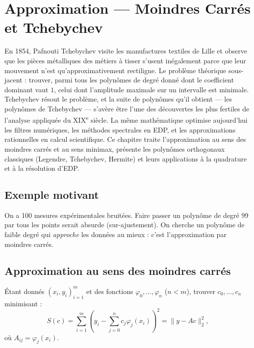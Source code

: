 \chapter{Approximation --- Moindres Carr\'es et Tchebychev}
\label{ch:approximation}

En 1854, Pafnouti Tchebychev visite les manufactures textiles de Lille et observe que les pièces métalliques des métiers à tisser s'usent inégalement parce que leur mouvement n'est qu'approximativement rectiligne. Le problème théorique sous-jacent : trouver, parmi tous les polynômes de degré donné dont le coefficient dominant vaut $1$, celui dont l'amplitude maximale sur un intervalle est minimale. Tchebychev résout le problème, et la suite de polynômes qu'il obtient --- les polynômes de Tchebychev --- s'avère être l'une des découvertes les plus fertiles de l'analyse appliquée du XIX\textsuperscript{e} siècle. La même mathématique optimise aujourd'hui les filtres numériques, les méthodes spectrales en EDP, et les approximations rationnelles en calcul scientifique. Ce chapitre traite l'approximation au sens des moindres carrés et au sens minimax, présente les polynômes orthogonaux classiques (Legendre, Tchebychev, Hermite) et leurs applications à la quadrature et à la résolution d'EDP.

\section{Exemple motivant}
On a 100 mesures exp\'erimentales bruit\'ees. Faire passer un polyn\^ome de degr\'e 99 par tous les points serait absurde (sur-ajustement). On cherche un polyn\^ome de faible degr\'e qui \emph{approche} les donn\'ees au mieux : c'est l'approximation par moindres carr\'es.

\section{Approximation au sens des moindres carr\'es}

\begin{definition}
\'Etant donn\'es $(x_i,y_i)_{i=1}^m$ et des fonctions $\varphi_0,\ldots,\varphi_n$ ($n<m$), trouver $c_0,\ldots,c_n$ minimisant :
\[
S(c) = \sum_{i=1}^m\left(y_i-\sum_{j=0}^n c_j\varphi_j(x_i)\right)^2 = \|y-Ac\|_2^2,
\]
o\`u $A_{ij}=\varphi_j(x_i)$.
\end{definition}

